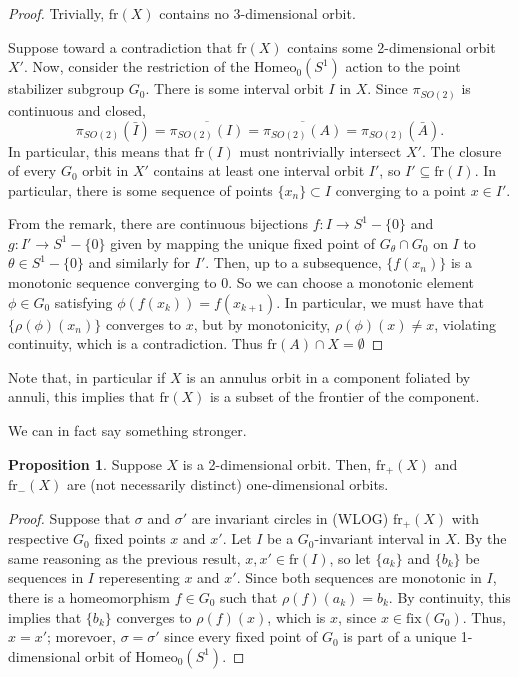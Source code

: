 \documentclass[10pt, oneside]{article}
\newcommand{\homeoS}{\text{Homeo}_0(S^1)}
\theoremstyle{definition}
\newtheorem{prop}{Proposition}[section]
\theoremstyle{definition}
\begin{document}
\begin{proof}
    Trivially, $\text{fr}(X)$ contains no 3-dimensional orbit.

    Suppose toward a contradiction that $\text{fr}(X)$ contains some 2-dimensional orbit $X'$. Now, consider the restriction of the $\homeoS$ action to the point stabilizer subgroup $G_0$. There is some interval orbit $I$ in $X$. Since $\pi_{SO(2)}$ is continuous and closed, $$\pi_{SO(2)}(\bar{I}) = \overline{\pi_{SO(2)}(I)} = \overline{\pi_{SO(2)}(A)} = \pi_{SO(2)}(\bar{A}).$$ In particular, this means that $\text{fr}(I)$ must nontrivially intersect $X'$. The closure of every $G_0$ orbit in $X'$ contains at least one interval orbit $I'$, so $I'\subseteq \text{fr}(I)$. In particular, there is some sequence of points $\{x_n\}\subset I$ converging to a point $x\in I'$.

    From the remark, there are continuous bijections $f:I\to S^1-\{0\}$ and $g:I'\to S^1-\{0\}$ given by mapping the unique fixed point of $G_\theta\cap G_0$ on $I$ to $\theta\in S^1 - \{0\}$ and similarly for $I'$. Then, up to a subsequence, $\{f(x_n)\}$ is a monotonic sequence converging to 0. So we can choose a monotonic element $\phi\in G_0$ satisfying $\phi(f(x_k)) = f(x_{k+1})$. In particular, we must have that $\{\rho(\phi)( x_n)\}$ converges to $x$, but by monotonicity, $\rho(\phi)(x) \neq x$, violating continuity, which is a contradiction. Thus $\text{fr}(A)\cap X = \emptyset$
\end{proof}

Note that, in particular if $X$ is an annulus orbit in a component foliated by annuli, this implies that $\text{fr}(X)$ is a subset of the frontier of the component.

We can in fact say something stronger.

\begin{prop}
    Suppose $X$ is a 2-dimensional orbit. Then, $\text{fr}_+(X)$ and $\text{fr}_-(X)$ are (not necessarily distinct) one-dimensional orbits.
\end{prop}

\begin{proof}
    Suppose that $\sigma$ and $\sigma'$ are invariant circles in (WLOG) $\text{fr}_+(X)$ with respective $G_0$ fixed points $x$ and $x'$. Let $I$ be a $G_0$-invariant interval in $X$. By the same reasoning as the previous result, $x, x'\in \text{fr}(I)$, so let $\{a_k\}$ and $\{b_k\}$ be sequences in $I$ reperesenting $x$ and $x'$. Since both sequences are monotonic in $I$, there is a homeomorphism $f\in G_0$ such that $\rho(f)(a_k) = b_k$. By continuity, this implies that $\{b_k\}$ converges to $\rho(f)(x)$, which is $x$, since $x\in\text{fix}(G_0)$. Thus, $x=x'$; morevoer, $\sigma = \sigma'$ since every fixed point of $G_0$ is part of a unique 1-dimensional orbit of $\homeoS$.
\end{proof}
\end{document}
